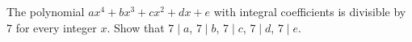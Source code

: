The polynomial $ax^4 + bx^3 + cx^2 + dx + e$ with integral coefficients is divisible by $7$ for every integer $x$. Show that $7 \mid a$, $7 \mid b$, $7 \mid c$, $7 \mid d$, $7 \mid e$.
